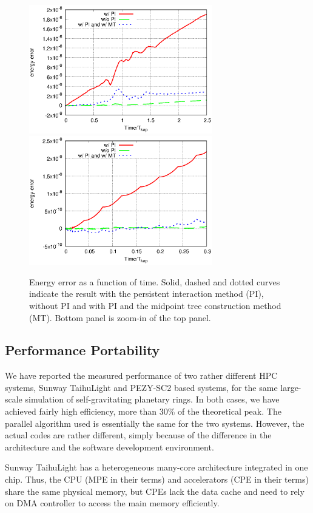 \documentclass[Afour,sageh,times]{sagej}
\begin{document}
\begin{figure}
  \centering
  \includegraphics[width=8cm,clip]{./fig/data/err0.eps}
  \includegraphics[width=8cm,clip]{./fig/data/err1.eps}
  \caption{Energy error as a function of time. Solid, dashed and
    dotted curves indicate the result with the persistent interaction
    method (PI), without PI and with PI and the midpoint tree
    construction method (MT). Bottom panel is zoom-in of the top
    panel.}
  \label{fig:err}
\end{figure}


\subsection{Performance Portability}

We have reported the measured performance of two rather different HPC
systems, Sunway TaihuLight and PEZY-SC2 based systems, for the same
large-scale simulation of self-gravitating planetary rings.  In both
cases, we have achieved fairly high efficiency, more than 30\% of the
theoretical peak. The parallel algorithm used is essentially the same
for the two systems. However, the actual codes are rather different,
simply because of the difference in the architecture and the software
development environment.

Sunway TaihuLight has a heterogeneous many-core architecture
integrated in one chip. Thus, the CPU (MPE in their terms) and
accelerators (CPE in their terms) share the same physical memory, but
CPEs lack the data cache and need to rely on DMA controller to access
the main memory efficiently.
\end{document}
